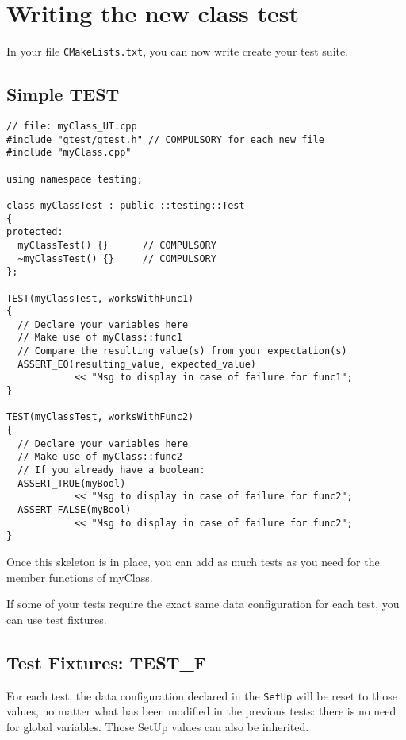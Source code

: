 \documentclass{article}
\begin{document}
\section{Writing the new class test}

In your file \texttt{CMakeLists.txt}, you can now write create your test suite.

\subsection{Simple TEST}

\begin{verbatim}
// file: myClass_UT.cpp
#include "gtest/gtest.h" // COMPULSORY for each new file
#include "myClass.cpp"  

using namespace testing;

class myClassTest : public ::testing::Test
{
protected:
  myClassTest() {}      // COMPULSORY
  ~myClassTest() {}     // COMPULSORY
};

TEST(myClassTest, worksWithFunc1)
{
  // Declare your variables here
  // Make use of myClass::func1
  // Compare the resulting value(s) from your expectation(s)
  ASSERT_EQ(resulting_value, expected_value)
            << "Msg to display in case of failure for func1";
}

TEST(myClassTest, worksWithFunc2)
{
  // Declare your variables here
  // Make use of myClass::func2
  // If you already have a boolean:
  ASSERT_TRUE(myBool)
            << "Msg to display in case of failure for func2";
  ASSERT_FALSE(myBool)
            << "Msg to display in case of failure for func2";   
}
\end{verbatim}

Once this skeleton is in place, you can add as much tests as you need for the member functions of myClass.

If some of your tests require the exact same data configuration for each test, you can use test fixtures.

\subsection{Test Fixtures: TEST\_F}

For each test, the data configuration declared in the \texttt{SetUp} will be reset to those values, no matter what has been modified in the previous tests: there is no need for global variables. Those SetUp values can also be inherited.
\end{document}

